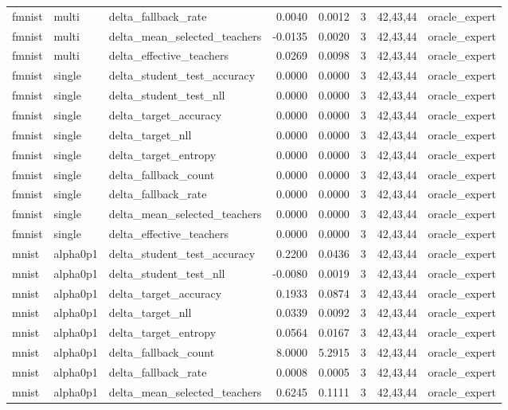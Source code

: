 \begin{tabular}{lllrrrll}
fmnist & multi & delta\_fallback\_rate & 0.0040 & 0.0012 & 3 & 42,43,44 & oracle\_expert \\
fmnist & multi & delta\_mean\_selected\_teachers & -0.0135 & 0.0020 & 3 & 42,43,44 & oracle\_expert \\
fmnist & multi & delta\_effective\_teachers & 0.0269 & 0.0098 & 3 & 42,43,44 & oracle\_expert \\
fmnist & single & delta\_student\_test\_accuracy & 0.0000 & 0.0000 & 3 & 42,43,44 & oracle\_expert \\
fmnist & single & delta\_student\_test\_nll & 0.0000 & 0.0000 & 3 & 42,43,44 & oracle\_expert \\
fmnist & single & delta\_target\_accuracy & 0.0000 & 0.0000 & 3 & 42,43,44 & oracle\_expert \\
fmnist & single & delta\_target\_nll & 0.0000 & 0.0000 & 3 & 42,43,44 & oracle\_expert \\
fmnist & single & delta\_target\_entropy & 0.0000 & 0.0000 & 3 & 42,43,44 & oracle\_expert \\
fmnist & single & delta\_fallback\_count & 0.0000 & 0.0000 & 3 & 42,43,44 & oracle\_expert \\
fmnist & single & delta\_fallback\_rate & 0.0000 & 0.0000 & 3 & 42,43,44 & oracle\_expert \\
fmnist & single & delta\_mean\_selected\_teachers & 0.0000 & 0.0000 & 3 & 42,43,44 & oracle\_expert \\
fmnist & single & delta\_effective\_teachers & 0.0000 & 0.0000 & 3 & 42,43,44 & oracle\_expert \\
mnist & alpha0p1 & delta\_student\_test\_accuracy & 0.2200 & 0.0436 & 3 & 42,43,44 & oracle\_expert \\
mnist & alpha0p1 & delta\_student\_test\_nll & -0.0080 & 0.0019 & 3 & 42,43,44 & oracle\_expert \\
mnist & alpha0p1 & delta\_target\_accuracy & 0.1933 & 0.0874 & 3 & 42,43,44 & oracle\_expert \\
mnist & alpha0p1 & delta\_target\_nll & 0.0339 & 0.0092 & 3 & 42,43,44 & oracle\_expert \\
mnist & alpha0p1 & delta\_target\_entropy & 0.0564 & 0.0167 & 3 & 42,43,44 & oracle\_expert \\
mnist & alpha0p1 & delta\_fallback\_count & 8.0000 & 5.2915 & 3 & 42,43,44 & oracle\_expert \\
mnist & alpha0p1 & delta\_fallback\_rate & 0.0008 & 0.0005 & 3 & 42,43,44 & oracle\_expert \\
mnist & alpha0p1 & delta\_mean\_selected\_teachers & 0.6245 & 0.1111 & 3 & 42,43,44 & oracle\_expert \\

\end{tabular}
